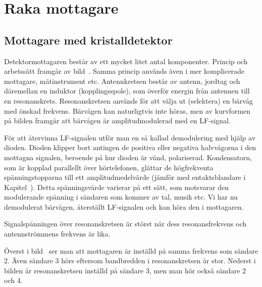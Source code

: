 \section{Raka mottagare}

\subsection{Mottagare med kristalldetektor}


Detektormottagaren består av ett mycket litet antal komponenter.
Princip och arbetssätt framgår av bild~.
Samma princip används även i mer komplicerade mottagare, mätinstrument etc.
Antennkretsen består av antenn, jordtag och däremellan en induktor
(kopplingsspole), som överför energin från antennen till en resonanskrets.
Resonanskretsen används för att välja ut (selektera) en bärvåg med önskad
frekvens.
Bärvågen kan naturligtvis inte höras, men av kurvformen på bilden framgår
att bärvågen är amplitudmodulerad med en LF-signal.

För att återvinna LF-signalen utför man en så kallad demodulering med hjälp
av dioden.
Dioden klipper bort antingen de positiva eller negativa halvvågorna i den
mottagna signalen, beroende på hur dioden är vänd, polariserad.
Kondensatorn, som är kopplad parallellt över hörtelefonen, glättar de
högfrekventa spänningstopparna till ett amplitudmedelvärde (jämför med
entaktsblandare i Kapitel~).
Detta spänningsvärde varierar på ett sätt, som motsvarar den modulerande
spänning i sändaren som kommer av tal, musik etc.
Vi har nu demodulerat bärvågen, återställt LF-signalen och kan höra den i
mottagaren.

Signalspänningen över resonanskretsen är störst när dess
resonansfrekvens och antennströmmens frekvens är lika.

{}

Överst i bild~ ser man att mottagaren är inställd på
samma frekvens som sändare 2.
Även sändare 3 hörs eftersom bandbredden i resonanskretsen är stor.
Nederst i bilden är resonanskretsen inställd på sändare 3, men man hör
också sändare 2 och 4.


